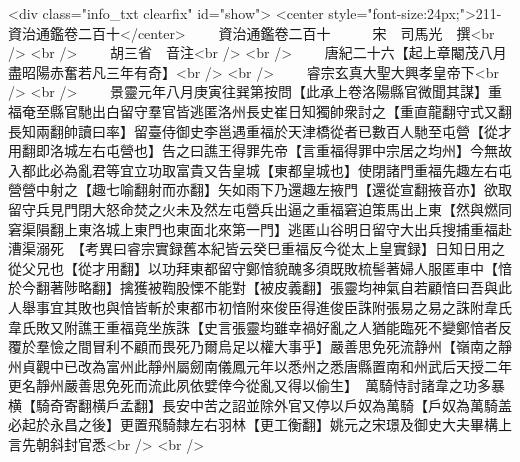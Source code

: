 <div class="info_txt clearfix" id="show">
<center style="font-size:24px;">211-資治通鑑卷二百十</center>
  　　資治通鑑卷二百十　　　宋　司馬光　撰<br />
<br />
　　胡三省　音注<br />
<br />
　　唐紀二十六【起上章閹茂八月盡昭陽赤奮若凡三年有奇】<br />
<br />
　　睿宗玄真大聖大興孝皇帝下<br />
<br />
　　景靈元年八月庚寅往巽第按問【此承上卷洛陽縣官微聞其謀】重福奄至縣官馳出白留守羣官皆逃匿洛州長史崔日知獨帥衆討之【重直龍翻守式又翻長知兩翻帥讀曰率】留臺侍御史李邕遇重福於天津橋從者已數百人馳至屯營【從才用翻即洛城左右屯營也】告之曰譙王得罪先帝【言重福得罪中宗居之均州】今無故入都此必為亂君等宜立功取富貴又告皇城【東都皇城也】使閉諸門重福先趣左右屯營營中射之【趣七喻翻射而亦翻】矢如雨下乃還趣左掖門【還從宣翻掖音亦】欲取留守兵見門閉大怒命焚之火未及然左屯營兵出逼之重福窘迫策馬出上東【然與燃同窘渠隕翻上東洛城上東門也東面北來第一門】逃匿山谷明日留守大出兵搜捕重福赴漕渠溺死　【考異曰睿宗實録舊本紀皆云癸巳重福反今從太上皇實録】日知日用之從父兄也【從才用翻】以功拜東都留守鄭愔貌醜多須既敗梳髻著婦人服匿車中【愔於今翻著陟略翻】擒獲被鞫股慄不能對【被皮義翻】張靈均神氣自若顧愔曰吾與此人舉事宜其敗也與愔皆斬於東都市初愔附來俊臣得進俊臣誅附張易之易之誅附韋氏韋氏敗又附譙王重福竟坐族誅【史言張靈均雖幸禍好亂之人猶能臨死不變鄭愔者反覆於羣憸之間冒利不顧而畏死乃爾烏足以權大事乎】嚴善思免死流静州【嶺南之靜州貞觀中已改為富州此靜州屬劒南儀鳳元年以悉州之悉唐縣置南和州武后天授二年更名靜州嚴善思免死而流此夙依嬖倖今從亂又得以偷生】　萬騎恃討諸韋之功多暴横【騎奇寄翻横戶孟翻】長安中苦之詔並除外官又停以戶奴為萬騎【戶奴為萬騎盖必起於永昌之後】更置飛騎隸左右羽林【更工衡翻】姚元之宋璟及御史大夫畢構上言先朝斜封官悉<br />
<br />
